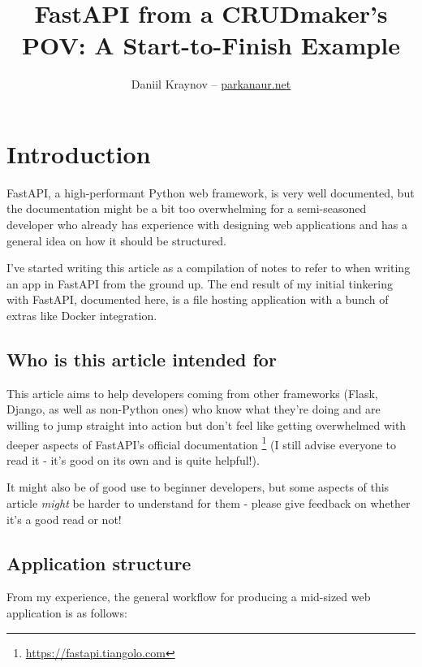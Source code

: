 \documentclass[14pt]{extarticle}
\title{FastAPI from a CRUDmaker's POV: A Start-to-Finish Example}
\author{Daniil Kraynov -- \href{https://parkanaur.net}{parkanaur.net}}
\begin{document}
\maketitle

{\hypersetup{linkcolor=black}
\tableofcontents}

\section{Introduction}

FastAPI, a high-performant Python web framework, is very well documented, but the documentation might be a bit too overwhelming for a semi-seasoned developer who already has experience with designing web applications and has a general idea on how it should be structured.

I've started writing this article as a compilation of notes to refer to when writing an app in FastAPI from the ground up. The end result of my initial tinkering with FastAPI, documented here, is a file hosting application with a bunch of extras like Docker integration.

\subsection{Who is this article intended for}

This article aims to help developers coming from other frameworks (Flask, Django, as well as non-Python ones) who know what they're doing and are willing to jump straight into action but don't feel like getting overwhelmed with deeper aspects of FastAPI's official documentation \footnote{\href{https://fastapi.tiangolo.com}{https://fastapi.tiangolo.com}} (I still advise everyone to read it - it's good on its own and is quite helpful!).

It might also be of good use to beginner developers, but some aspects of this article \textit{might} be harder to understand for them - please give feedback on whether it's a good read or not!

\subsection{Application structure}

From my experience, the general workflow for producing a mid-sized web application is as follows:
\end{document}
